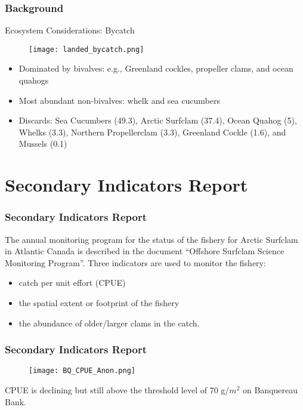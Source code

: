 \documentclass{beamer}
\begin{document}
\begin{frame}
\frametitle{Background}
Ecosystem Considerations: Bycatch
\begin{figure}
        \begin{center}
            \texttt{[image: landed\_bycatch.png]}
        \end{center}
    \end{figure}


\begin{itemize}
\item Dominated by bivalves: e.g., Greenland cockles, propeller clams, and ocean quahogs
\item Most abundant non-bivalves: whelk and sea cucumbers
\item Discards: Sea Cucumbers (49.3), Arctic Surfclam (37.4), Ocean Quahog (5), Whelks (3.3), Northern Propellerclam (3.3), Greenland Cockle (1.6), and Mussels (0.1)
\end{itemize}

\end{frame}



\section{Secondary Indicators Report}


\begin{frame}
\frametitle{Secondary Indicators Report}
The annual monitoring program for the status of the fishery for Arctic Surfclam in Atlantic Canada is described in the document “Offshore Surfclam Science Monitoring Program”. Three indicators are used to monitor the fishery: 
\begin{itemize}
\item catch per unit effort (CPUE)
\item the spatial extent or footprint of the fishery
\item the abundance of older/larger clams in the catch.
\end{itemize}

\end{frame}

\begin{frame}
\frametitle{Secondary Indicators Report}
\begin{figure}
        \begin{center}
            \texttt{[image: BQ\_CPUE\_Anon.png]}
        \end{center}
    \end{figure}

CPUE is declining but still above the threshold level of 70 g/\(m^2\) on Banquereau Bank.
\end{frame}
\end{document}
